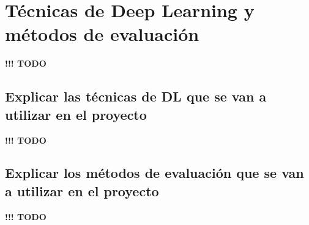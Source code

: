 \section{Técnicas de Deep Learning y métodos de evaluación}


\textbf{!!! TODO}

\subsection{Explicar las técnicas de DL que se van a utilizar en el proyecto}


\textbf{!!! TODO}

\subsection{Explicar los métodos de evaluación que se van a utilizar en el proyecto}


\textbf{!!! TODO}
